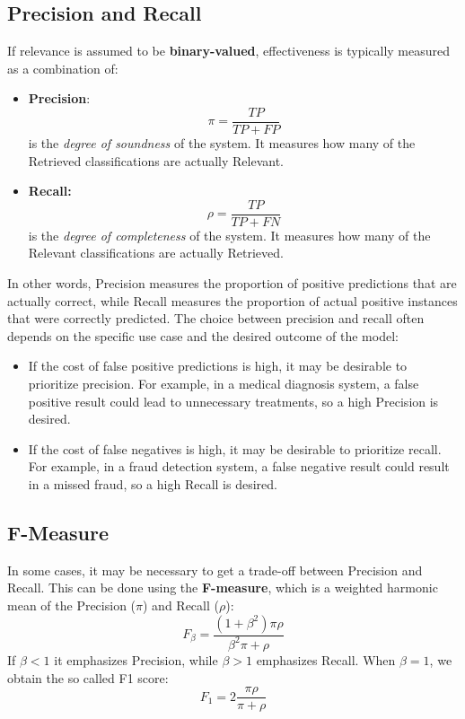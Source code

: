 \subsection{Precision and Recall}
If relevance is assumed to be \textbf{binary-valued}, effectiveness is typically measured as a combination of:
\begin{itemize}
    \item \textbf{Precision}: 
    \[\pi = \frac{TP}{TP + FP}\]
    is the \textit{degree of soundness} of the system. It measures how many of the Retrieved classifications are actually Relevant.

    \item \textbf{Recall:}
    \[\rho = \frac{TP}{TP + FN}\]
    is the \textit{degree of completeness} of the system. It measures how many of the Relevant classifications are actually Retrieved.
\end{itemize}
In other words, Precision measures the proportion of positive predictions that are actually correct, while Recall measures the proportion of actual positive instances that were correctly predicted.\newline\newline
The choice between precision and recall often depends on the specific use case and the desired outcome of the model:
\begin{itemize}
    \item If the cost of false positive predictions is high, it may be desirable to prioritize precision. For example, in a medical diagnosis system, a false positive result could lead to unnecessary treatments, so a high Precision is desired.

    \item If the cost of false negatives is high, it may be desirable to prioritize recall. For example, in a fraud detection system, a false negative result could result in a missed fraud, so a high Recall is desired.
\end{itemize}

\subsection{F-Measure}
In some cases, it may be necessary to get a trade-off between Precision and Recall. This can be done using the \textbf{F-measure}, which is a weighted harmonic mean of the Precision ($\pi$) and Recall ($\rho$):
\[F_{\beta} = \frac{(1 + \beta^{2})\pi \rho}{\beta^{2}\pi + \rho}\]
If $\beta < 1$ it emphasizes Precision, while $\beta > 1$ emphasizes Recall. When $\beta = 1$, we obtain the so called F1 score:
\[F_{1} = 2\frac{\pi\rho}{\pi + \rho}\]

